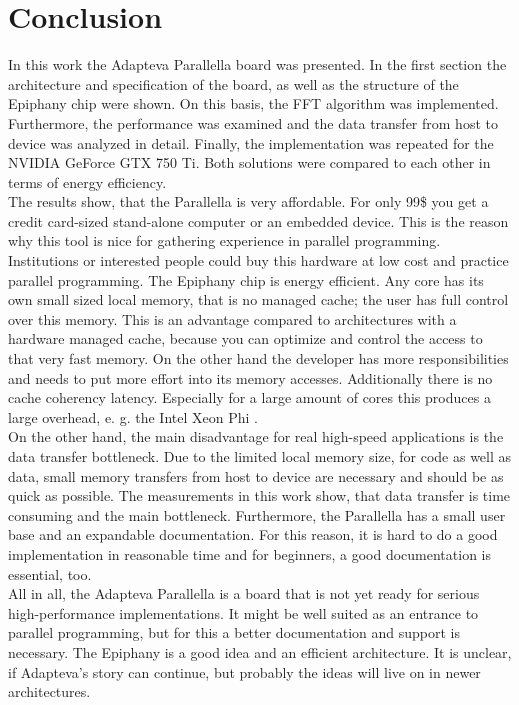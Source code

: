 \documentclass[american, hauptseminar, twoside]{zihpub}
\begin{document}
	\section{Conclusion}
		In this work the Adapteva Parallella board was presented. In the first section the architecture and specification of the board, as well as the structure of the Epiphany chip were shown. On this basis, the FFT algorithm was implemented. Furthermore, the performance was examined and the data transfer from host to device was analyzed in detail. Finally, the implementation was repeated for the NVIDIA GeForce GTX 750 Ti. Both solutions were compared to each other in terms of energy efficiency.
		\\
		The results show, that the Parallella is very affordable. For only 99\$ you get a credit card-sized stand-alone computer or an embedded device. This is the reason why this tool is nice for gathering experience in parallel programming. Institutions or interested people could buy this hardware at low cost and practice parallel programming. The Epiphany chip is energy efficient. Any core has its own small sized local memory, that is no managed cache; the user has full control over this memory. This is an advantage compared to architectures with a hardware managed cache, because you can optimize and control the access to that very fast memory. On the other hand the developer has more responsibilities and needs to put more effort into its memory accesses. Additionally there is no cache coherency latency. Especially for a large amount of cores this produces a large overhead, e. g. the Intel Xeon Phi \cite{Fang2013}.
		\\
		On the other hand, the main disadvantage for real high-speed applications is the data transfer bottleneck. Due to the limited local memory size, for code as well as data, small memory transfers from host to device are necessary and should be as quick as possible. The measurements in this work show, that data transfer is time consuming and the main bottleneck. Furthermore, the Parallella has a small user base and an expandable documentation. For this reason, it is hard to do a good implementation in reasonable time and for beginners, a good documentation is essential, too.
		\\
		All in all, the Adapteva Parallella is a board that is not yet ready for serious high-performance implementations. It might be well suited as an entrance to parallel programming, but for this a better documentation and support is necessary. The Epiphany is a good idea and an efficient architecture. It is unclear, if Adapteva's story can continue, but probably the ideas will live on in newer architectures.
	\clearpage
	\nocite{*}
	\printbibliography[heading=bibintoc]
\end{document}
